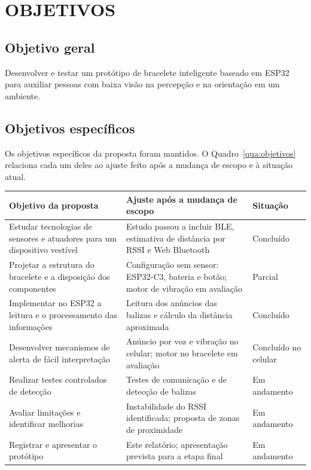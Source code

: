 \chapter{OBJETIVOS}
\label{cap:objetivos}

\section{Objetivo geral}
\label{sec:objetivo-geral}

Desenvolver e testar um protótipo de bracelete inteligente baseado em ESP32 para auxiliar pessoas com baixa visão na percepção e na orientação em um ambiente.

\section{Objetivos específicos}
\label{sec:objetivos-especificos}

Os objetivos específicos da proposta foram mantidos. O Quadro~\ref{qua:objetivos} relaciona cada um deles ao ajuste feito após a mudança de escopo e à situação atual.

\begin{quadro}[htb]
\caption{Objetivos específicos, ajustes e situação atual}
\label{qua:objetivos}
\small
\begin{tabular}{|p{5.2cm}|p{6.2cm}|p{2.6cm}|}
\hline
\textbf{Objetivo da proposta} & \textbf{Ajuste após a mudança de escopo} & \textbf{Situação} \\
\hline
Estudar tecnologias de sensores e atuadores para um dispositivo vestível & Estudo passou a incluir BLE, estimativa de distância por RSSI e Web Bluetooth & Concluído \\
\hline
Projetar a estrutura do bracelete e a disposição dos componentes & Configuração sem sensor: ESP32-C3, bateria e botão; motor de vibração em avaliação & Parcial \\
\hline
Implementar no ESP32 a leitura e o processamento das informações & Leitura dos anúncios das balizas e cálculo da distância aproximada & Concluído \\
\hline
Desenvolver mecanismos de alerta de fácil interpretação & Anúncio por voz e vibração no celular; motor no bracelete em avaliação & Concluído no celular \\
\hline
Realizar testes controlados de detecção & Testes de comunicação e de detecção de balizas & Em andamento \\
\hline
Avaliar limitações e identificar melhorias & Instabilidade do RSSI identificada; proposta de zonas de proximidade & Em andamento \\
\hline
Registrar e apresentar o protótipo & Este relatório; apresentação prevista para a etapa final & Em andamento \\
\hline
\end{tabular}
\normalsize
{}
\end{quadro}

